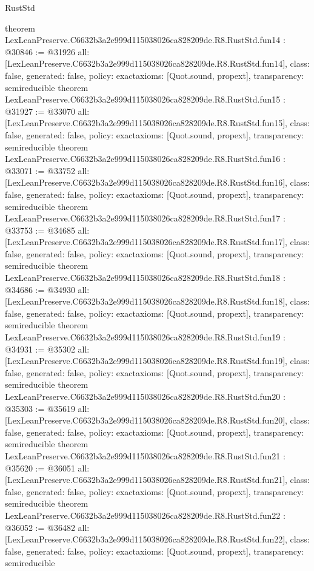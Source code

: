 \begin{lexlean}{RustStd}
\begin{coremodule}
{}
theorem LexLeanPreserve.C6632b3a2e999d115038026ca828209de.R8.RustStd.fun14 : @30846 := @31926 {
  all: [LexLeanPreserve.C6632b3a2e999d115038026ca828209de.R8.RustStd.fun14],
  class: false,
  generated: false,
  policy: exact{axioms: [Quot.sound, propext]},
  transparency: semireducible
}
theorem LexLeanPreserve.C6632b3a2e999d115038026ca828209de.R8.RustStd.fun15 : @31927 := @33070 {
  all: [LexLeanPreserve.C6632b3a2e999d115038026ca828209de.R8.RustStd.fun15],
  class: false,
  generated: false,
  policy: exact{axioms: [Quot.sound, propext]},
  transparency: semireducible
}
theorem LexLeanPreserve.C6632b3a2e999d115038026ca828209de.R8.RustStd.fun16 : @33071 := @33752 {
  all: [LexLeanPreserve.C6632b3a2e999d115038026ca828209de.R8.RustStd.fun16],
  class: false,
  generated: false,
  policy: exact{axioms: [Quot.sound, propext]},
  transparency: semireducible
}
theorem LexLeanPreserve.C6632b3a2e999d115038026ca828209de.R8.RustStd.fun17 : @33753 := @34685 {
  all: [LexLeanPreserve.C6632b3a2e999d115038026ca828209de.R8.RustStd.fun17],
  class: false,
  generated: false,
  policy: exact{axioms: [Quot.sound, propext]},
  transparency: semireducible
}
theorem LexLeanPreserve.C6632b3a2e999d115038026ca828209de.R8.RustStd.fun18 : @34686 := @34930 {
  all: [LexLeanPreserve.C6632b3a2e999d115038026ca828209de.R8.RustStd.fun18],
  class: false,
  generated: false,
  policy: exact{axioms: [Quot.sound, propext]},
  transparency: semireducible
}
theorem LexLeanPreserve.C6632b3a2e999d115038026ca828209de.R8.RustStd.fun19 : @34931 := @35302 {
  all: [LexLeanPreserve.C6632b3a2e999d115038026ca828209de.R8.RustStd.fun19],
  class: false,
  generated: false,
  policy: exact{axioms: [Quot.sound, propext]},
  transparency: semireducible
}
theorem LexLeanPreserve.C6632b3a2e999d115038026ca828209de.R8.RustStd.fun20 : @35303 := @35619 {
  all: [LexLeanPreserve.C6632b3a2e999d115038026ca828209de.R8.RustStd.fun20],
  class: false,
  generated: false,
  policy: exact{axioms: [Quot.sound, propext]},
  transparency: semireducible
}
theorem LexLeanPreserve.C6632b3a2e999d115038026ca828209de.R8.RustStd.fun21 : @35620 := @36051 {
  all: [LexLeanPreserve.C6632b3a2e999d115038026ca828209de.R8.RustStd.fun21],
  class: false,
  generated: false,
  policy: exact{axioms: [Quot.sound, propext]},
  transparency: semireducible
}
theorem LexLeanPreserve.C6632b3a2e999d115038026ca828209de.R8.RustStd.fun22 : @36052 := @36482 {
  all: [LexLeanPreserve.C6632b3a2e999d115038026ca828209de.R8.RustStd.fun22],
  class: false,
  generated: false,
  policy: exact{axioms: [Quot.sound, propext]},
  transparency: semireducible
}
\end{coremodule}
\end{lexlean}
